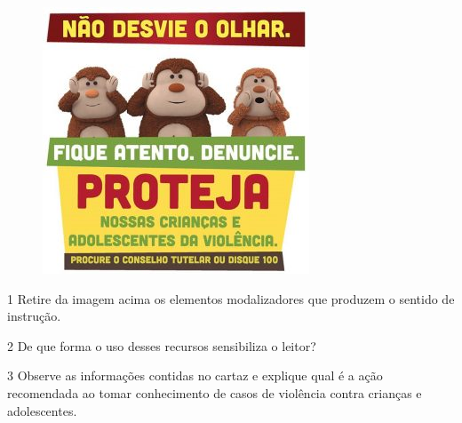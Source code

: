 \begin{figure}[htpb!]
\centering
\includegraphics[width=.7\textwidth]{./imgSAEB_7_POR/media/image9.png}
\end{figure}



\num{1} Retire da imagem acima os elementos modalizadores que produzem o sentido de instrução.


\num{2} De que forma o uso desses recursos sensibiliza o leitor?


\num{3} Observe as informações contidas no cartaz e explique qual é a ação
recomendada ao tomar conhecimento de casos de violência contra crianças e adolescentes.




